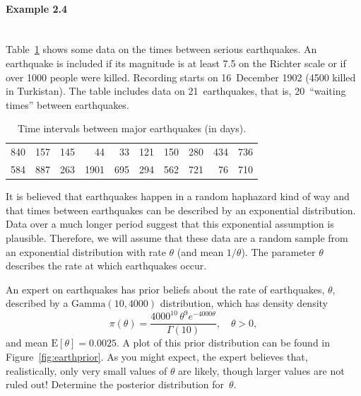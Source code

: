 \paragraph{Example 2.4}{~\\
Table~\ref{tab:earth} shows some data on the times between serious \label{ex:earth} earthquakes. An earthquake is included if its magnitude is at least 7.5 on the Richter scale or if over 1000 people were killed. Recording starts on 16~December 1902 (4500 killed in Turkistan). The table includes data on 21~earthquakes, that is, 20~``waiting times'' between earthquakes. 

\begin{table}[h]
\centering
\begin{tabular}{|rrrrrrrrrr|} \hline
840&157&145&44&33&121&150&280&434&736\\
584&887&263&1901&695&294&562&721&76&710\\ \hline
\end{tabular}
\caption{Time intervals between major earthquakes (in days).}
\label{tab:earth}
\end{table}

It is believed that earthquakes happen in a random haphazard kind of way and that times between earthquakes can be described by an exponential distribution. Data over a much longer period suggest that this exponential assumption is plausible. Therefore, we will assume that these data are a random sample from an exponential distribution with rate $\theta$ (and mean $1/\theta$). The parameter $\theta$ describes the rate at which earthquakes occur. 

An expert on earthquakes has prior beliefs about the rate of earthquakes, $\theta$, described by a $\mathrm{Gamma}(10,4000)$ distribution, which has density
density
\begin{equation}
\label{eq:earthprior}
\pi(\theta)=\frac{4000^{10}\,\theta^9e^{-4000\theta}}{\Gamma(10)}, 
\quad\theta>0, 
\end{equation}
and mean $\text{E}[\theta]=0.0025$. A plot of this prior distribution can be found in Figure~\ref{fig:earthprior}.  As you might expect, the expert believes that, realistically, only very small values of $\theta$ are likely, though larger values are not ruled out!  Determine the posterior distribution for~$\theta$.
\begin{figure}[ht]


\end{figure}}
